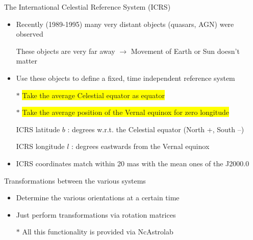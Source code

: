 \Tr
\onecolumn
\begin{center}
{\red The International Celestial Reference System (ICRS)}
\end{center}
%
\begin{itemize}
\item Recently (1989-1995) many very distant objects (quasars, AGN) were observed
\item[] These objects are very far away $\rightarrow$ Movement of Earth or Sun doesn't matter
\item Use these objects to define a fixed, time independent reference system
\item[$\ast$] \colorbox{yellow}{Take the average Celestial equator as equator}
\item[$\ast$] \colorbox{yellow}{Take the average position of the Vernal equinox for zero longitude}
\item[] {\blue ICRS latitude $b$} : degrees w.r.t. the Celestial equator (North +, South --)
\item[] {\blue ICRS longitude $l$} : degrees eastwards from the Vernal equinox
\item ICRS coordinates match within 20 mas with the mean ones of the J2000.0
\end{itemize}
%
\begin{center}
{\red Transformations between the various systems}
\end{center}
%
\begin{itemize}
\item Determine the various orientations at a certain time
\item Just perform transformations via rotation matrices
\item[$\ast$] {\blue All this functionality is provided via NcAstrolab}
\end{itemize}
